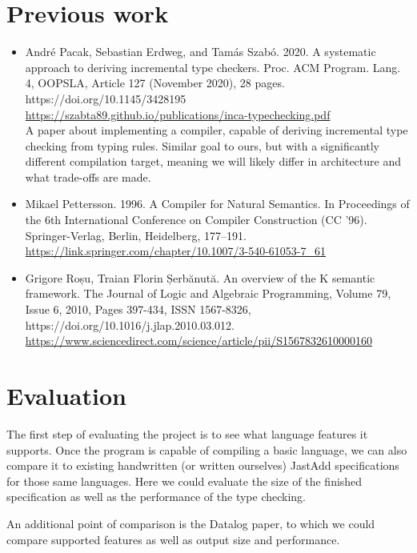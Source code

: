\documentclass{article}
\begin{document}
\section{Previous work}
\begin{itemize}
  \item
    André Pacak, Sebastian Erdweg, and Tamás Szabó. 2020. A systematic approach to deriving incremental type checkers. Proc. ACM Program. Lang. 4, OOPSLA, Article 127 (November 2020), 28 pages. https://doi.org/10.1145/3428195 \\
    \url{https://szabta89.github.io/publications/inca-typechecking.pdf} \\
    A paper about implementing a compiler, capable of deriving incremental type checking from typing rules.
    Similar goal to ours, but with a significantly different compilation target, meaning we will likely differ in architecture and what trade-offs are made.

  \item
    Mikael Pettersson. 1996. A Compiler for Natural Semantics. In Proceedings of the 6th International Conference on Compiler Construction (CC '96). Springer-Verlag, Berlin, Heidelberg, 177–191. \\
    \url{https://link.springer.com/chapter/10.1007/3-540-61053-7\_61} \\

  \item
    Grigore Roșu, Traian Florin Șerbănută. An overview of the K semantic framework.
The Journal of Logic and Algebraic Programming, Volume 79, Issue 6, 2010, Pages 397-434, ISSN 1567-8326, https://doi.org/10.1016/j.jlap.2010.03.012. \\
    \url{https://www.sciencedirect.com/science/article/pii/S1567832610000160} \\

\end{itemize}


\section{Evaluation}
The first step of evaluating the project is to see what language features it supports.
Once the program is capable of compiling a basic language, we can also compare it to existing handwritten (or written ourselves) JastAdd specifications for those same languages.
Here we could evaluate the size of the finished specification as well as the performance of the type checking.

An additional point of comparison is the Datalog paper, to which we could compare supported features as well as output size and performance.
\end{document}
